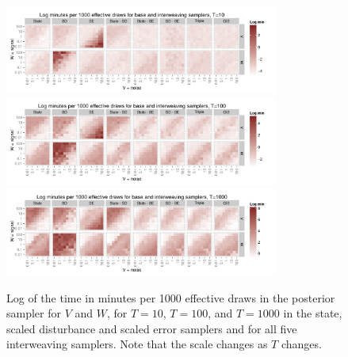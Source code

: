 \documentclass{article}
\begin{document}
\begin{figure}[!ht]
\centering
\includegraphics[width=0.8\textwidth]{../plots/baseinttimeplot10}
\includegraphics[width=0.8\textwidth]{../plots/baseinttimeplot100}
\includegraphics[width=0.8\textwidth]{../plots/baseinttimeplot1000}
\caption{Log of the time in minutes per 1000 effective draws in the posterior sampler for $V$ and $W$, for $T=10$, $T=100$, and $T=1000$ in the state, scaled disturbance and scaled error samplers and for all five interweaving samplers. Note that the scale changes as $T$ changes.}
\label{baseinttimeplot}
\end{figure}
\end{document}
